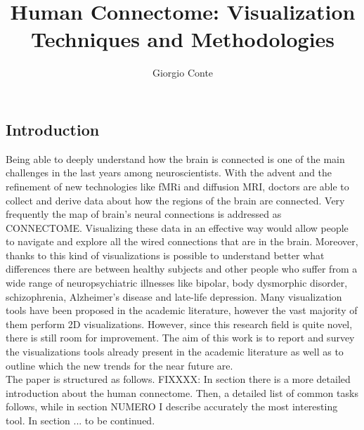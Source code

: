 \documentclass{article}
\title{Human Connectome: Visualization Techniques and Methodologies}
\author{Giorgio Conte}
\affil{Creative Coding Research Group\\ Department of Computer Science\\University of Illinois at Chicago}
\begin{document}
\maketitle
\begin{abstract}
\end{abstract}

\begin{multicols}{2}
\raggedcolumns

\section{Introduction}

Being able to deeply understand how the brain is connected is one of the main challenges in the last years among neuroscientists. With the advent and the refinement of new technologies like fMRi and diffusion MRI, doctors are able to collect and derive data about how the regions of the brain are connected. Very frequently the map of brain's neural connections is addressed as CONNECTOME.
Visualizing these data in an effective way would allow people to navigate and explore all the wired connections that are in the brain. Moreover, thanks to this kind of visualizations is possible to understand better what differences there are between healthy subjects and other people who suffer from a wide range of neuropsychiatric illnesses like bipolar, body dysmorphic disorder, schizophrenia, Alzheimer's disease and late-life depression. 
Many visualization tools have been proposed in the academic literature, however the vast majority of them perform 2D visualizations. However, since this research field is quite novel, there is still room for improvement.
The aim of this work is to report and survey the visualizations tools already present in the academic literature as well as to outline which the new trends for the near future are.\\
The paper is structured as follows. FIXXXX: In section there is a more detailed introduction about the human connectome. Then, a detailed list of common tasks follows, while in section NUMERO I describe accurately the most interesting tool. In section ... to be continued.

\end{multicols}
\end{document}
